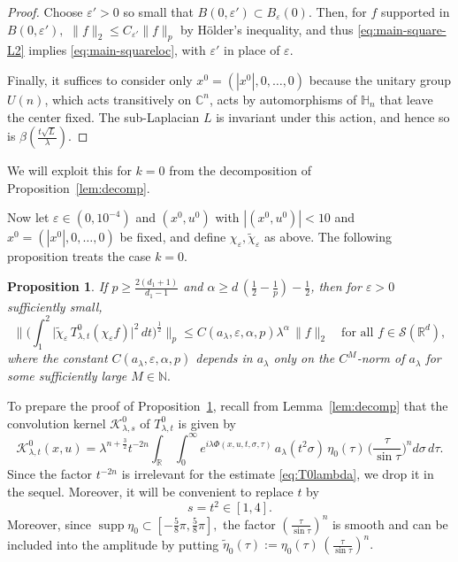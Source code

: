 \documentclass[leqno]{amsart}
\newtheorem{proposition}[theorem]{Proposition}
\theoremstyle{definition}
\theoremstyle{remark}
\numberwithin{equation}{section}
\newcommand{\R}{\mathbb{R}}
\newcommand{\N}{\mathbb{N}}
\newcommand{\eps}{\varepsilon}
\DeclareMathOperator*{\supp}{supp}
\newcommand\la{{\lambda}}
\newcommand\bbC{{\mathbb {C}}}
\newcommand\bbH{{\mathbb {H}}}
\newcommand\sK{{\mathscr {K}}}
\newcommand\ve{{\varepsilon}}
\begin{document}
\begin{proof} Choose $\eps'>0$ so small that $B(0,\eps')\subset B_\eps(0).$ Then, for $f$ supported in $B(0,\eps'),$
$\|f\|_2\le C_{\eps' }\|f\|_p$ by Hölder's inequality, and thus \eqref{eq:main-square-L2} implies \eqref{eq:main-squareloc}, with $\eps'$ in place of $\eps.$ 

Finally, it suffices to consider only $x^0 = (|x^0|,0,\dots,0)$ because the unitary group $U(n)$, which acts transitively on $\bbC^n$, acts by automorphisms of $\bbH_n$ that leave the  center fixed. The sub-Laplacian $L$ is invariant under this action, and hence so is $\beta(\frac{t\sqrt{L}}{\lambda})$.  
\end{proof}

We will exploit this for $k=0$ from the decomposition of Proposition~\ref{lem:decomp}.

\smallskip

Now let $\eps \in (0,10^{-4})$ and $(x^0,u^0)$ with $|(x^0,u^0)| < 10$ and $x^0 = (|x^0|,0,\ldots,0)$ be fixed, and define $\chi_\eps,\tilde\chi_\eps$ as above.
The following proposition treats the case $k = 0$.

\begin{proposition}\label{L:T0lambda}
If $p\ge \frac{2(d_1+1)}{d_1-1}$  and $\alpha \ge d \, (\tfrac12-\tfrac1p)-\tfrac12$, then for $\ve>0$ sufficiently small, 
\begin{equation}\label{eq:T0lambda}
\Big\| \Big( \int_1^2 \big| \tilde \chi_{\varepsilon} \, T_{\lambda,t}^0 ( \chi_{\varepsilon} f) \big|^2 \, dt \Big)^{\frac{1}{2}} \Big\|_p
\le C(a_\lambda, \ve, \alpha, p)\lambda^\alpha \, \|f\|_2 \quad \text{for all } f\in \mathcal S(\R^d),
\end{equation}
where the constant  $C(a_\lambda, \ve,\alpha, p)$ depends in $a_\la$ only on the $C^M$-norm of $a_\lambda$ for some sufficiently large $M\in\N.$
\end{proposition}

To  prepare the proof of Proposition~\ref{L:T0lambda}, recall from Lemma~\ref{lem:decomp} that  the convolution kernel $\sK_{\lambda,s}^{0}$ of $T_{\lambda,t}^{0}$ is given by
\[
\sK_{\lambda,t}^{0}(x, u) = \lambda^{ n+\frac{3}{2}} t^{-2n} \int_\R \, \int_0^\infty e^{i\lambda\Phi(x,u,t,\sigma,\tau)} \, a_\lambda(t^2\sigma) \, \eta_0( \tau) \, \Big(\frac{\tau}{\sin\tau}\Big)^{n} d\sigma \, d\tau.
\]
Since the factor $t^{-2n}$ is irrelevant for the estimate \eqref{eq:T0lambda}, we drop it in the sequel. Moreover, it will be convenient to replace $t$ by $$s=t^2\in[1,4].$$
Moreover, since $\supp\eta_0\subset [-\tfrac 58 \pi, \tfrac 58 \pi],$ the factor $(\frac{\tau}{\sin\tau})^{n}$ is smooth and can be included into the amplitude by putting $\tilde \eta_0(\tau):=\eta_0(\tau)\, (\frac{\tau}{\sin\tau})^{n}.$ 
\end{document}
